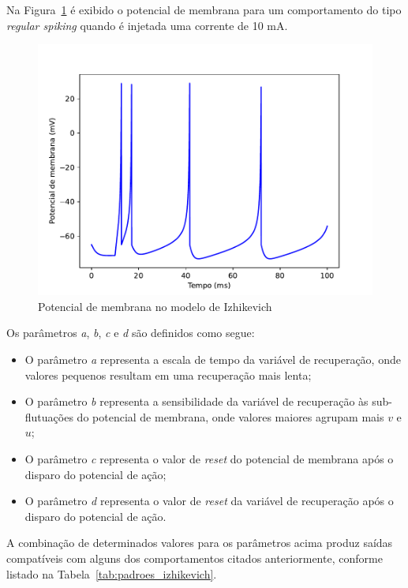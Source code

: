 Na Figura~\ref{fig:izhikevich} é exibido o potencial de membrana para um comportamento do tipo \textit{regular spiking} quando é injetada uma corrente de 10 mA.
\begin{figure}[tb]
	\centering
	\caption[Potencial de membrana no modelo de Izhikevich]{Potencial de membrana no modelo de Izhikevich}
	\label{fig:izhikevich}
	\includegraphics[width=0.7\linewidth]{figs/izhikevich}
\end{figure}
Os parâmetros \textit{a}, \textit{b}, \textit{c} e \textit{d} são definidos como segue:
\begin{itemize}
	\item O parâmetro \textit{a} representa a escala de tempo da variável de recuperação, onde valores pequenos resultam em uma recuperação mais lenta;
	\item O parâmetro \textit{b} representa a sensibilidade da variável de recuperação às sub-flutuações do potencial de membrana, onde valores maiores agrupam mais $v$ e $u$;
	\item O parâmetro \textit{c} representa o valor de \textit{reset} do potencial de membrana após o disparo do potencial de ação;
	\item O parâmetro \textit{d} representa o valor de \textit{reset} da variável de recuperação após o disparo do potencial de ação.
\end{itemize}
A combinação de determinados valores para os parâmetros acima produz saídas compatíveis com alguns dos comportamentos citados anteriormente, conforme listado na Tabela~\ref{tab:padroes_izhikevich}.
